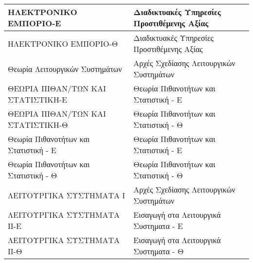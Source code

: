 \documentclass[12pt,a4paper,final]{article}
\begin{document}
\begin{landscape}
\begin{center}
\begin{longtable}{|l|l|}
\hline
ΗΛΕΚΤΡΟΝΙΚΟ ΕΜΠΟΡΙΟ-Ε                                                                                           & Διαδικτυακές Υπηρεσίες Προστιθέμενης Αξίας                                                                           \\ 
\hline
ΗΛΕΚΤΡΟΝΙΚΟ ΕΜΠΟΡΙΟ-Θ                                                                                           & Διαδικτυακές Υπηρεσίες Προστιθέμενης Αξίας                                                                           \\ 
\hline
Θεωρία Λειτουργικών Συστημάτων                                                                                  & Αρχές Σχεδίασης Λειτουργικών Συστημάτων                                                                              \\ 
\hline
ΘΕΩΡΙΑ ΠΙΘΑΝ/ΤΩΝ ΚΑΙ ΣΤΑΤΙΣΤΙΚΗ-Ε                                                                               & Θεωρία Πιθανοτήτων και Στατιστική - Ε                                                                                \\ 
\hline
ΘΕΩΡΙΑ ΠΙΘΑΝ/ΤΩΝ ΚΑΙ ΣΤΑΤΙΣΤΙΚΗ-Θ                                                                               & Θεωρία Πιθανοτήτων και Στατιστική - Θ                                                                                \\ 
\hline
Θεωρία Πιθανοτήτων και Στατιστική - Ε                                                                           & Θεωρία Πιθανοτήτων και Στατιστική - Ε                                                                                \\ 
\hline
Θεωρία Πιθανοτήτων και Στατιστική - Θ                                                                           & Θεωρία Πιθανοτήτων και Στατιστική - Θ                                                                                \\ 
\hline
ΛΕΙΤΟΥΡΓΙΚΑ ΣΥΣΤΗΜΑΤΑ Ι                                                                                         & Αρχές Σχεδίασης Λειτουργικών Συστημάτων                                                                              \\ 
\hline
ΛΕΙΤΟΥΡΓΙΚΑ ΣΥΣΤΗΜΑΤΑ ΙΙ-Ε                                                                                      & Εισαγωγή στα Λειτουργικά Συστηματα - Ε                                                                               \\ 
\hline
ΛΕΙΤΟΥΡΓΙΚΑ ΣΥΣΤΗΜΑΤΑ ΙΙ-Θ                                                                                      & Εισαγωγή στα Λειτουργικά Συστηματα - Θ                                                                               \\ 

\end{longtable}
\end{center}
\end{landscape}
\end{document}
